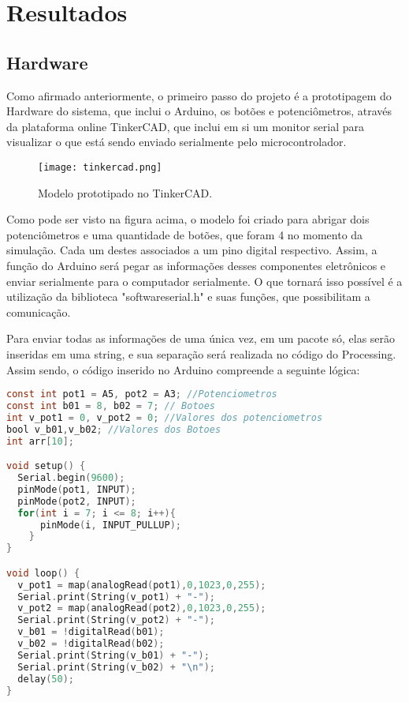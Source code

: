 \section{Resultados}
	
\subsection{Hardware}

	Como afirmado anteriormente, o primeiro passo do projeto é a prototipagem do Hardware do sistema, que inclui o Arduino, os botões e potenciômetros, através da plataforma online TinkerCAD, que inclui em si um monitor serial para visualizar o que está sendo enviado serialmente pelo microcontrolador.

\begin{figure}[htbp]
     \centerline{
        \texttt{[image: tinkercad.png]}
        }
     \caption{Modelo prototipado no TinkerCAD.}
     \label{fig}
    \end{figure}

	Como pode ser visto na figura acima, o modelo foi criado para abrigar dois potenciômetros e uma quantidade de botões, que foram 4 no momento da simulação. Cada um destes associados a um pino digital respectivo. Assim, a função do Arduino será pegar as informações desses componentes eletrônicos e enviar serialmente para o computador serialmente. O que tornará isso possível é a utilização da biblioteca "softwareserial.h" e suas funções, que possibilitam a comunicação.
	
	Para enviar todas as informações de uma única vez, em um pacote só, elas serão inseridas em uma string, e sua separação será realizada no código do Processing. Assim sendo, o código inserido no Arduino compreende a seguinte lógica:

\begin{lstlisting}[language=C]
const int pot1 = A5, pot2 = A3; //Potenciometros
const int b01 = 8, b02 = 7; // Botoes
int v_pot1 = 0, v_pot2 = 0; //Valores dos potenciometros
bool v_b01,v_b02; //Valores dos Botoes
int arr[10];

void setup() {
  Serial.begin(9600);
  pinMode(pot1, INPUT);
  pinMode(pot2, INPUT);
  for(int i = 7; i <= 8; i++){
      pinMode(i, INPUT_PULLUP);
    }
}

void loop() {
  v_pot1 = map(analogRead(pot1),0,1023,0,255);
  Serial.print(String(v_pot1) + "-");
  v_pot2 = map(analogRead(pot2),0,1023,0,255);
  Serial.print(String(v_pot2) + "-");
  v_b01 = !digitalRead(b01);
  v_b02 = !digitalRead(b02);
  Serial.print(String(v_b01) + "-");
  Serial.print(String(v_b02) + "\n");
  delay(50);
}
\end{lstlisting}

